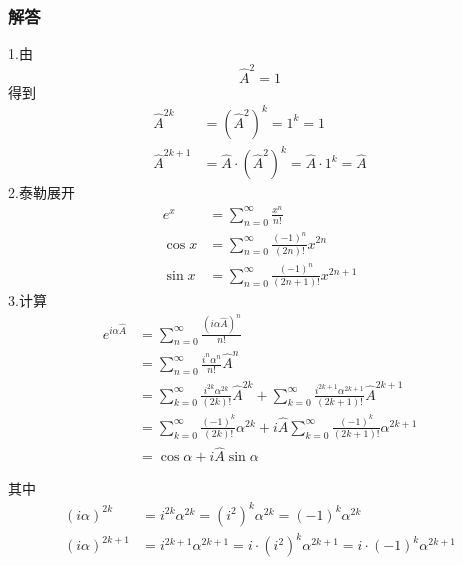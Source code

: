 \subsubsection{解答}
1.由
\begin{equation}
    \hat{A}^2=1
\end{equation}
得到
\begin{equation}
    \begin{aligned}
        \hat{A}^{2k}&=(\hat{A}^2)^k=1^k=1
\\
\hat{A}^{2k+1}&=\hat{A}\cdot (\hat{A}^2)^k=\hat{A}\cdot 1^k=\hat{A}
    \end{aligned}
\end{equation}
2.泰勒展开
\begin{equation}
    \begin{aligned}
        e^x&=\sum_{n=0}^{\infty}{\frac{x^n}{n!}}
\\
\cos x&=\sum_{n=0}^{\infty}{\frac{\left( -1 \right) ^n}{\left( 2n \right) !}}x^{2n}
\\
\sin x&=\sum_{n=0}^{\infty}{\frac{\left( -1 \right) ^n}{\left( 2n+1 \right) !}}x^{2n+1}
    \end{aligned}
\end{equation}
3.计算
\begin{equation}
    \begin{aligned}
        e^{i\alpha \hat{A}}&=\sum_{n=0}^{\infty}{\frac{(i\alpha \hat{A})^n}{n!}}
\\
&=\sum_{n=0}^{\infty}{\frac{i^n\alpha ^n}{n!}}\hat{A}^n
\\
&=\sum_{k=0}^{\infty}{\frac{i^{2k}\alpha ^{2k}}{\left( 2k \right) !}}\hat{A}^{2k}+\sum_{k=0}^{\infty}{\frac{i^{2k+1}\alpha ^{2k+1}}{\left( 2k+1 \right) !}}\hat{A}^{2k+1}
\\
&=\sum_{k=0}^{\infty}{\frac{\left( -1 \right) ^k}{\left( 2k \right) !}}\alpha ^{2k}+i\hat{A}\sum_{k=0}^{\infty}{\frac{\left( -1 \right) ^k}{\left( 2k+1 \right) !}}\alpha ^{2k+1}
\\
&=\cos \alpha +i\hat{A}\sin \alpha 
    \end{aligned}
\end{equation}

其中
\begin{equation}
    \begin{aligned}
        \left( i\alpha \right) ^{2k}&=i^{2k}\alpha ^{2k}=\left( i^2 \right) ^k\alpha ^{2k}=\left( -1 \right) ^k\alpha ^{2k}
\\
\left( i\alpha \right) ^{2k+1}&=i^{2k+1}\alpha ^{2k+1}=i\cdot \left( i^2 \right) ^k\alpha ^{2k+1}=i\cdot \left( -1 \right) ^k\alpha ^{2k+1}
    \end{aligned}
\end{equation}


